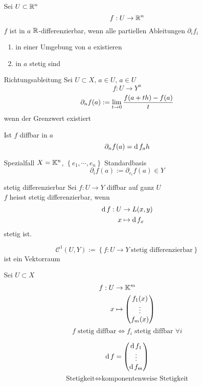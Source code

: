 \begin{Kor}
  Sei $U\subset\mathbb{R}^n$
  \[f:U\to\mathbb{R}^n\]
  $f$ ist in $a$ $\mathbb{R}$-differenzierbar, wenn alle partiellen Ableitungen $\partial_if_i$
  \begin{enumerate}
    \item in einer Umgebung von $a$ existieren
    \item in $a$ stetig sind
  \end{enumerate}
\end{Kor}
\begin{Def}{Richtungsableitung}
  Sei $U\subset X$, $a\in U$, $a\in U$
  \[f:U\to Y^n\]
  \[\partial_nf(a):=\displaystyle\lim_{t\rightarrow0}\frac{f(a+th)-f(a)}{t}\]
  wenn der Grenzwert existiert
\end{Def}
\begin{Kor}
  Ist $f$ diffbar in $a$
  \[\partial_nf(a)=\operatorname{d} f_a h\]
\end{Kor}
\begin{Bem}{Spezialfall}
  $X=\mathbb{K}^n$, $\left\{ e_1,\cdots,e_n \right\}$ Standardbasis
  \[\partial_if(a):=\partial_{e_i}f(a)\in Y\]
\end{Bem}
\begin{Def}{stetig differenzierbar}
  Sei $f:U\to Y$ diffbar auf ganz $U$\\
  $f$ heisst stetig differenzierbar, wenn
  \begin{align*}
    \operatorname{d} f:U&\to L(x,y)\\
    x&\mapsto \operatorname{d} f_x
  \end{align*}
  stetig ist.
\end{Def}
\begin{Bem}
  \[\mathcal{C}^1(U,Y):= \left\{ f:U\to Y\ \text{stetig differenzierbar} \right\}\]
  ist ein Vektorraum
\end{Bem}
\begin{Lem}
  Sei $U\subset X$
  \begin{align*}
    f:U&\to\mathbb{K}^m\\
    x&\mapsto \begin{pmatrix}f_1(x)\\\vdots\\f_m(x)\end{pmatrix}
  \end{align*}
  \[\text{$f$ stetig diffbar}\iff\text{$f_i$ stetig diffbar $\forall i$}\]
\end{Lem}
\begin{Bew}
  \[\operatorname{d} f=\begin{pmatrix}\operatorname{d} f_1\\\vdots\\\operatorname{d} f_m\end{pmatrix}\]
  \[\text{Stetigkeit}\iff\text{komponentenweise Stetigkeit}\]
\end{Bew}
